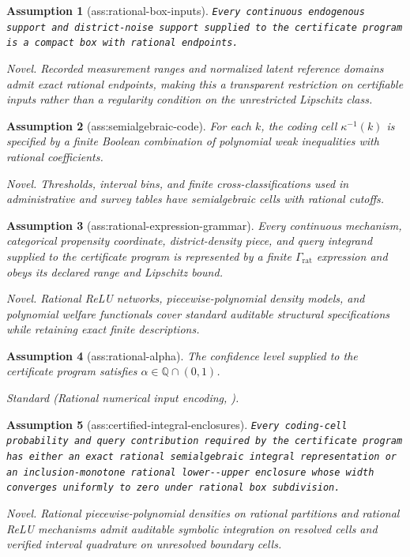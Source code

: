 \documentclass{article}
\newtheorem{assumption}{Assumption}
\begin{document}
\begin{assumption}[ass:rational-box-inputs]\label{ass:rational-box-inputs}
\texttt{Every continuous endogenous support and district-\allowbreak{}noise support supplied to the certificate program is a compact box with rational endpoints.}
\par\smallskip\noindent\emph{Novel.} Recorded measurement ranges and normalized latent reference domains admit exact rational endpoints, making this a transparent restriction on certifiable inputs rather than a regularity condition on the unrestricted Lipschitz class.
\end{assumption}

\begin{assumption}[ass:semialgebraic-code]\label{ass:semialgebraic-code}
For each \(k\), the coding cell \(\kappa^{-1}(k)\) is specified by a finite Boolean combination of polynomial weak inequalities with rational coefficients.
\par\smallskip\noindent\emph{Novel.} Thresholds, interval bins, and finite cross-classifications used in administrative and survey tables have semialgebraic cells with rational cutoffs.
\end{assumption}

\begin{assumption}[ass:rational-expression-grammar]\label{ass:rational-expression-grammar}
Every continuous mechanism, categorical propensity coordinate, district-density piece, and query integrand supplied to the certificate program is represented by a finite \(\Gamma_{\mathrm{rat}}\) expression and obeys its declared range and Lipschitz bound.
\par\smallskip\noindent\emph{Novel.} Rational ReLU networks, piecewise-polynomial density models, and polynomial welfare functionals cover standard auditable structural specifications while retaining exact finite descriptions.
\end{assumption}

\begin{assumption}[ass:rational-alpha]\label{ass:rational-alpha}
The confidence level supplied to the certificate program satisfies \(\alpha\in\mathbb Q\cap(0,1)\).
\par\smallskip\noindent\emph{Standard} (Rational numerical input encoding, \cite{CookKochSteffyWolter2013}).
\end{assumption}

\begin{assumption}[ass:certified-integral-enclosures]\label{ass:certified-integral-enclosures}
\texttt{Every coding-\allowbreak{}cell probability and query contribution required by the certificate program has either an exact rational semialgebraic integral representation or an inclusion-\allowbreak{}monotone rational lower-\allowbreak{}-\allowbreak{}upper enclosure whose width converges uniformly to zero under rational box subdivision.}
\par\smallskip\noindent\emph{Novel.} Rational piecewise-polynomial densities on rational partitions and rational ReLU mechanisms admit auditable symbolic integration on resolved cells and verified interval quadrature on unresolved boundary cells.
\end{assumption}
\end{document}
